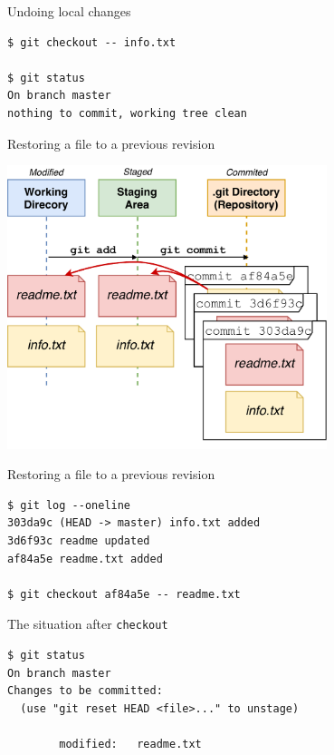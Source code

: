 \documentclass[
  11pt,
  american,
  ignorenonframetext,
  aspectratio=43,
  compress,
  xcolor=dvipsnames]{beamer}
\begin{document}
\begin{frame}[fragile]{Undoing local changes}
\protect\hypertarget{undoing-local-changes-2}{}
\begin{verbatim}
$ git checkout -- info.txt

$ git status
On branch master
nothing to commit, working tree clean
\end{verbatim}
\end{frame}

\begin{frame}{Restoring a file to a previous revision}
\protect\hypertarget{restoring-a-file-to-a-previous-revision}{}
\begin{center}
\includegraphics[width=0.7\textwidth]{./images/git_workflow_timemachine.pdf}
\end{center}
\end{frame}

\begin{frame}[fragile]{Restoring a file to a previous revision}
\protect\hypertarget{restoring-a-file-to-a-previous-revision-1}{}
\begin{verbatim}
$ git log --oneline
303da9c (HEAD -> master) info.txt added
3d6f93c readme updated
af84a5e readme.txt added

$ git checkout af84a5e -- readme.txt
\end{verbatim}
\end{frame}

\begin{frame}[fragile]{The situation after \texttt{checkout}}
\protect\hypertarget{the-situation-after-checkout}{}
\begin{verbatim}
$ git status
On branch master
Changes to be committed:
  (use "git reset HEAD <file>..." to unstage)

        modified:   readme.txt
\end{verbatim}
\end{frame}
\end{document}
